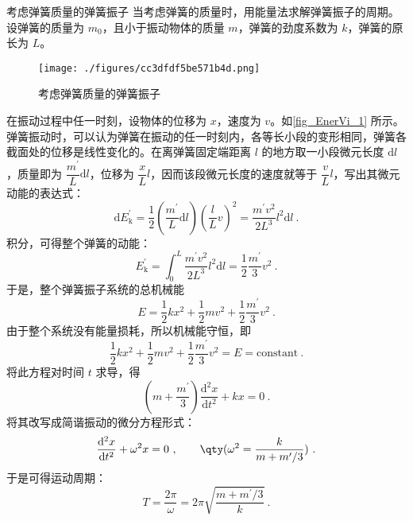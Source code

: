 \begin{example}{考虑弹簧质量的弹簧振子}
当考虑弹簧的质量时，用能量法求解弹簧振子的周期。设弹簧的质量为 $m_0$，且小于振动物体的质量 $m$，弹簧的劲度系数为 $k$，弹簧的原长为 $L$。

\begin{figure}[ht]
\centering
\texttt{[image: ./figures/cc3dfdf5be571b4d.png]}
\caption{考虑弹簧质量的弹簧振子} \label{fig_EnerVi_1}
\end{figure}

在振动过程中任一时刻，设物体的位移为 $x $，速度为 $v$。如\autoref{fig_EnerVi_1} 所示。弹簧振动时，可以认为弹簧在振动的任一时刻内，各等长小段的变形相同，弹簧各截面处的位移是线性变化的。在离弹簧固定端距离 $l$ 的地方取一小段微元长度 $\mathrm dl$，质量即为 $\dfrac{m^\prime}{L}\mathrm{d}l$，位移为 $\dfrac{x}{L}l$，因而该段微元长度的速度就等于 $\dfrac{v}{L}l$，写出其微元动能的表达式：
\begin{equation}
\mathrm{d} E_{\mathrm{k}}^{\prime}=\frac{1}{2}\left(\frac{m^{\prime}}{L} \mathrm{d} l\right)\left(\frac{l}{L} v\right)^{2}=\frac{m^{\prime} v^{2}}{2 L^{3}} l^{2} \mathrm{d} l~.
\end{equation}
积分，可得整个弹簧的动能：
\begin{equation}
E_{\mathrm{k}}^{\prime}=\int_{0}^{L} \frac{m^{\prime} v^{2}}{2 L^{3}} l^{2} \mathrm{d} l=\frac{1}{2} \frac{m^{\prime}}{3} v^{2}~.
\end{equation}
于是，整个弹簧振子系统的总机械能
\begin{equation}
E=\frac{1}{2} k x^{2}+\frac{1}{2} m v^{2}+\frac{1}{2} \frac{m^{\prime}}{3} v^{2}~.
\end{equation}
由于整个系统没有能量损耗，所以机械能守恒，即
\begin{equation}
\frac{1}{2} k x^{2}+\frac{1}{2} m v^{2}+\frac{1}{2} \frac{m^{\prime}}{3} v^{2}=E=\mathrm{constant}~.
\end{equation}
将此方程对时间 $t $ 求导，得
\begin{equation}
\left(m+\frac{m^{\prime}}{3}\right) \frac{\mathrm{d}^{2} x}{\mathrm{d} t^{2}}+k x=0~.
\end{equation}
将其改写成简谐振动的微分方程形式：
\begin{equation}
\frac{\mathrm{d}^{2} x}{\mathrm{d} t^{2}}+\omega^{2} x=0~, \qquad \qty(\omega^{2}=\frac{k}{m+m^{\prime} / 3})~.
\end{equation}
于是可得运动周期：
\begin{equation}
T=\frac{2 \pi}{\omega}=2 \pi \sqrt{\frac{m+m^{\prime} / 3}{k}}~.
\end{equation}

\end{example}
